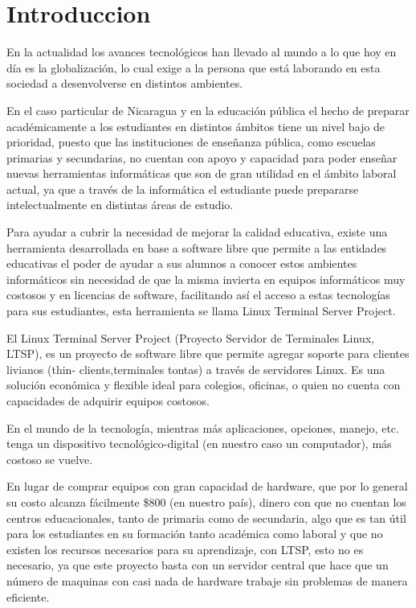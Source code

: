 \documentclass[11pt]{report}
\begin{document}
\section{Introduccion}
En la actualidad los avances tecnol\'ogicos han llevado al mundo a lo que hoy en día es la globalizaci\'on, lo cual exige a la persona que est\'a 
laborando en esta sociedad a desenvolverse en distintos ambientes. 

En el caso particular de Nicaragua y en la educaci\'on p\'ublica el hecho de preparar 
acad\'emicamente a los estudiantes en distintos \'ambitos tiene un nivel bajo de prioridad, puesto que las instituciones de enseñanza p\'ublica, como 
escuelas primarias y secundarias, no cuentan con apoyo y capacidad para poder enseñar nuevas herramientas inform\'aticas que son de gran utilidad en 
el \'ambito laboral actual, ya que a trav\'es de la inform\'atica el estudiante puede prepararse intelectualmente en distintas \'areas de estudio. 

Para ayudar a cubrir la necesidad de mejorar la calidad educativa, existe una herramienta desarrollada en base a software libre que permite a las 
entidades educativas el poder de ayudar a sus alumnos a conocer estos ambientes inform\'aticos sin necesidad de que la misma invierta en equipos 
inform\'aticos muy costosos y en licencias de software, facilitando así el acceso a estas tecnolog\'ias para sus estudiantes, esta herramienta se 
llama Linux Terminal Server Project. 

El Linux Terminal Server Project (Proyecto Servidor de Terminales Linux, LTSP), es un proyecto de software libre que permite agregar soporte para 
clientes livianos (thin- clients,terminales tontas) a trav\'es de servidores Linux. Es una soluci\'on econ\'omica y flexible ideal para colegios, 
oficinas, o quien no cuenta con capacidades de adquirir equipos costosos. 

En el mundo de la tecnolog\'ia, mientras m\'as aplicaciones, opciones, manejo, etc. tenga un dispositivo tecnol\'ogico-digital (en nuestro caso un 
computador), m\'as costoso se vuelve. 

En lugar de comprar equipos con gran capacidad de hardware, que por lo general su costo alcanza f\'acilmente \$800 (en nuestro pa\'is), dinero con 
que no cuentan los centros educacionales, tanto de primaria como de secundaria, algo que es tan \'util para los estudiantes en su formaci\'on tanto 
acad\'emica como laboral y que no existen los recursos necesarios para su aprendizaje, con LTSP, esto no es necesario, ya que este proyecto basta 
con un servidor central que hace que un n\'umero de maquinas con casi nada de hardware trabaje sin problemas de manera eficiente. 
\end{document}
